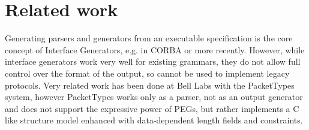\section{Related work}

Generating parsers and generators from an executable specification is the core concept of Interface
Generators, e.g. in CORBA or more recently\cite{varda2008}. However, while interface
generators work very well for existing grammars, they do not allow full control over the format of
the output, so cannot be used to implement legacy protocols.
Very related work has been done at Bell Labs with the PacketTypes system\cite{mccann2000packet},
however PacketTypes works only as a parser, not as an output generator and does not support the expressive power of PEGs, but rather
implements a C like structure model enhanced with data-dependent length fields and constraints.

\begin{comment}

Memory corruption exploits (frequently) rely on placing controlled values at known (or controlled)
memory locations. Exploit countermeasures  like Address-Space Layout Randomisation\cite{pax-aslr},
 heap cookies \cite{heapcookies} or data execution prevention try to make this harder for
 an attacker. Attackers have developed techniques such as heap spraying \cite{heapspray} and heap
 feng shui\cite{fengshui} to help bypass those mitigations. 


Nail parsers use two arena allocators\cite{arena}, one for the temporary syntax tree and one for the
result. If Nail were to use the normal system allocator, the attacker could cause two packets to be
parsed at the same time (or, given a sufficiently complicated input, two structure within the same
grammar to be parsed sequentially) such that the (invalid) intermediate results from one parse,  
 If there is a buffer overflow past the
end of one input, it is much harder for the attacker craft a sequence of packets to trick the allocator into
placing a known value next to that input.

\end{comment}
